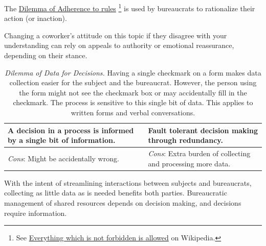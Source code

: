 The \hyperref[table:rule-adherence]{Dilemma of Adherence to rules}
\footnote{See \href{https://en.wikipedia.org/wiki/Everything_which_is_not_forbidden_is_allowed}{Everything which is not forbidden is allowed} 
on Wikipedia.} is used by bureaucrats to rationalize their action (or inaction). 

Changing a coworker's attitude on this topic if they disagree with your understanding can rely on appeals to authority or emotional reassurance, depending on their stance.



  


\begin{center}
\begin{table}[H] %
\begin{tabular}{ | m{\dilemmatablewidth}| m{\dilemmatablewidth} | } 
  \hline
  \textbf{A decision in a process is informed by a single bit of information.} & 
  \textbf{Fault tolerant decision making through redundancy.} \\ 
  \hline
  \textit{Cons}: Might be accidentally wrong. &
  \textit{Cons}: Extra burden of collecting and processing more data. \\  
  \hline
\end{tabular}
\caption{
\textit{Dilemma of Data for Decisions.}
Having a single checkmark on a form makes data collection easier for the subject and the bureaucrat. However, the person using the form might not see the checkmark box or may accidentally fill in the checkmark. The process is sensitive to this single bit of data. This applies to written forms and verbal conversations.
}
\label{table:single-bit-decision}
\end{table}
\end{center}

With the intent of streamlining interactions between subjects and bureaucrats, collecting as little data as is needed benefits both parties. Bureaucratic management of shared resources depends on decision making, and decisions require information. 


